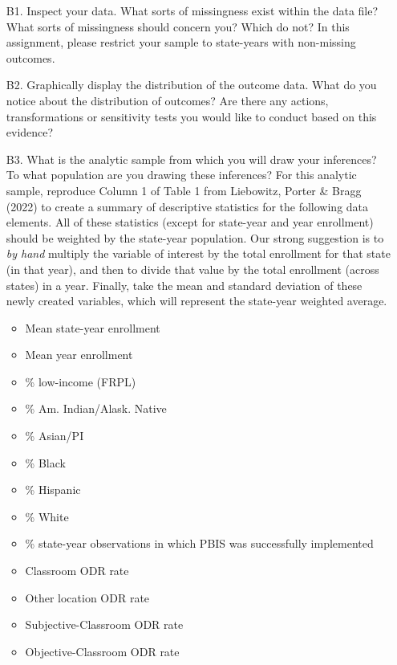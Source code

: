 \documentclass[a4paper, 11pt]{article}
\begin{document}
\begin{enumerate}
	\item[B1.] Inspect your data. What sorts of missingness exist within the data file? What sorts of missingness should concern you? Which do not? In this assignment, please restrict your sample to state-years with non-missing outcomes.
	\item[B2.] Graphically display the distribution of the outcome data. What do you notice about the distribution of outcomes? Are there any actions, transformations or sensitivity tests you would like to conduct based on this evidence?
	\item[B3.] What is the analytic sample from which you will draw your inferences? To what population are you drawing these inferences? For this analytic sample, reproduce Column 1 of Table 1 from Liebowitz, Porter \& Bragg (2022) to create a summary of descriptive statistics for the following data elements. All of these statistics (except for state-year and year enrollment) should be weighted by the state-year population. Our strong suggestion is to \textit{by hand} multiply the variable of interest by the total enrollment for that state (in that year), and then to divide that value by the total enrollment (across states) in a year. Finally, take the mean and standard deviation of these newly created variables, which will represent the state-year weighted average.

	\begin{itemize} 
		\item Mean state-year enrollment 
		\item Mean year enrollment
		\item \% low-income (FRPL)
		\item \% Am. Indian/Alask. Native
		\item \% Asian/PI
		\item \% Black
		\item \% Hispanic
		\item \% White
		\item \% state-year observations in which PBIS was successfully implemented
		\item Classroom ODR rate
		\item Other location ODR rate
		\item Subjective-Classroom ODR rate
		\item Objective-Classroom ODR rate
\end{itemize}


\end{enumerate}
\end{document}
